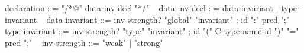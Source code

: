 \begin{syntax}
  declaration ::= { "/*@" data-inv-decl "*/" }
  \
  { data-inv-decl } ::= { data-invariant } | { type-invariant }
  \
  { data-invariant } ::= { { inv-strength? } "global" "invariant" } ;
                      { id ":" pred ";" } 
  \
  { type-invariant } ::= { { inv-strength? } "type" "invariant" };
                      { id "(" C-type-name id ")" "=" pred ";" }
  \
  { inv-strength } ::= { "weak" } | { "strong" }
\end{syntax}
